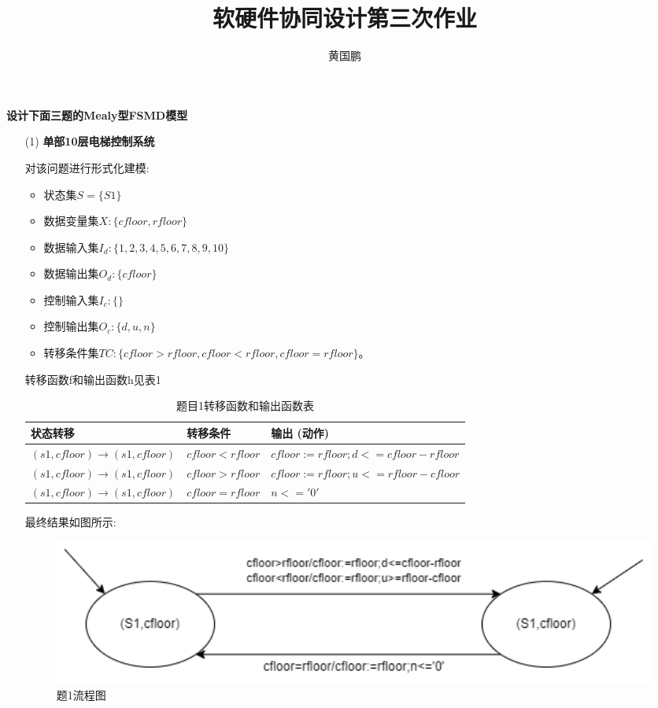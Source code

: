 \documentclass[11pt,oneside,a4paper]{article}
\author{黄国鹏}
\title{软硬件协同设计第三次作业}
\begin{document}
\maketitle

\textbf{设计下面三题的Mealy型FSMD模型}
\begin{enumerate}
    \item[(1)]\textbf{单部10层电梯控制系统}
    
        对该问题进行形式化建模:
        \begin{itemize}
            \item 状态集$S=\{S1\}$
            \item 数据变量集$X:\{cfloor,rfloor\}$
            \item 数据输入集$I_d:\{1,2,3,4,5,6,7,8,9,10\}$
            \item 数据输出集$O_d:\{cfloor\}$
            \item 控制输入集$I_c:\{\}$
            \item 控制输出集$O_c:\{d,u,n\}$
            \item 转移条件集$TC:\{cfloor > rfloor, cfloor < rfloor, cfloor=rfloor\}。$
        \end{itemize}
        转移函数f和输出函数h见表1
        \begin{table}[!h]
            \caption{题目1转移函数和输出函数表}
            \begin{tabular}{|l|l|l|}
            \hline
            状态转移  & 转移条件 & 输出 (动作) \\ \hline
            $(s1,cfloor) \to (s1,cfloor)$ & 
            $cfloor < rfloor$             &  
            $cfloor := rfloor ;d<=cfloor-rfloor$ \\ \hline
            $(s1,cfloor) \to (s1,cfloor)$ &  
            $cfloor > rfloor$             &  
            $cfloor := rfloor ;u<=rfloor-cfloor$ \\ \hline
            $(s1,cfloor) \to (s1,cfloor)$ &  
            $cfloor = rfloor$             &  
            $n<='0'$                               \\ \hline
            \end{tabular}
            \end{table}
        最终结果如图所示:
        \begin{figure}[!h]
            \centering
            \includegraphics[width=1.2\textwidth]{3_1_elevator.png}
            \caption{题1流程图}
        \end{figure}


\end{enumerate}
\end{document}
